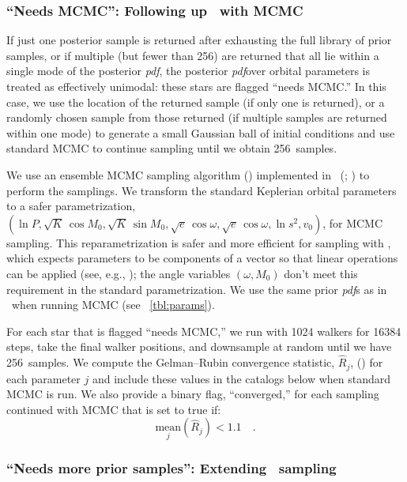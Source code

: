 \documentclass[modern, letterpaper]{aastex62}
\newcommand{\thejoker}{\project{The~Joker}}
\newcommand{\pdf}{\textit{pdf}}
\newcommand{\nposterior}{256}
\begin{document}
\subsubsection{``Needs MCMC'': Following up \thejoker\ with MCMC}
\label{sec:mcmc}

If just one posterior sample is returned after exhausting the full library of
prior samples, or if multiple (but fewer than \nposterior) are returned that all
lie within a single mode of the posterior \pdf, the posterior \pdf over orbital
parameters is treated as effectively unimodal: these stars are flagged ``needs
MCMC.''
In this case, we use the location of the returned sample (if only one is
returned), or a randomly chosen sample from those returned (if multiple samples
are returned within one mode) to generate a small Gaussian ball of initial
conditions and use standard MCMC to continue sampling until we obtain
\nposterior\ samples.

We use an ensemble MCMC sampling algorithm (\citealt{Goodman:2010}) implemented
in \python\ (; \citealt{Foreman-Mackey:2013}) to perform the
samplings.
We transform the standard Keplerian orbital parameters to a safer
parametrization, $(\ln P, \sqrt{K}\,\cos M_0, \sqrt{K}\,\sin M_0, \sqrt{e}\,\cos
\omega, \sqrt{e}\,\cos \omega, \ln s^2, v_0)$, for MCMC sampling.
This reparametrization is safer and more efficient for sampling with
, which expects parameters to be components of a vector so that
linear operations can be applied (see, e.g., \citealt{Hogg:2017}); the angle
variables $(\omega, M_0)$ don't meet this requirement in the standard
parametrization.
We use the same prior \pdf s as in \thejoker\ when running MCMC (see
\tablename~\ref{tbl:params}).

For each star that is flagged ``needs MCMC,'' we run  with 1024
walkers for 16384 steps, take the final walker positions, and downsample at
random until we have \nposterior\ samples.
We compute the Gelman--Rubin convergence statistic, $\hat{R}_j$,
(\citealt{Gelman:1992}) for each parameter $j$ and include these values in the
catalogs below when standard MCMC is run.
We also provide a binary flag, ``converged,'' for each sampling continued with
MCMC that is set to true if:
\begin{equation}
\underset{j}{\textrm{mean}}\left(\hat{R}_j\right) < 1.1 \quad .
\end{equation}


\subsubsection{``Needs more prior samples'': Extending \thejoker\ sampling}
\end{document}
